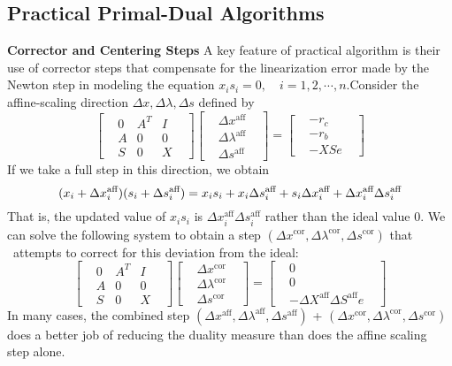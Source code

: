 \subsection{Practical Primal-Dual Algorithms} \label{subsec:-practical-primal-dual-algorithms}
\textbf{Corrector and Centering Steps}
A key feature of practical algorithm is their use of corrector steps that compensate for the linearization error made by
the Newton step in modeling the equation $x_i s_i = 0, \quad i = 1,2,\cdots, n$.Consider the affine-scaling direction
$\Delta x, \Delta \lambda, \Delta s $ defined by
\[
    \begin{bmatrix}
        & 0 & A^T & I & \\
        & A & 0 & 0 & \\
        & S & 0 & X
    \end{bmatrix}
    \begin{bmatrix}
        & \Delta x^{\text{aff}} &\\
        & \Delta \lambda^{\text{aff}} & \\
        & \Delta s^{\text{aff}} &
    \end{bmatrix} =
    \begin{bmatrix}
        & -r_c &\\
        & -r_b & \\
        & -XSe  &
    \end{bmatrix}\tag{14.30}\label{ipm: 14.30}
\]
If we take a full step in this direction, we obtain
\[
    (x_i + \Delta x_i^{\text{aff}})(s_i + \Delta s_i^{\text{aff}})\\
    = x_i s_i + x_i \Delta s_i^{\text{aff}} + s_i \Delta x_i^{\text{aff}} + \Delta x_i^{\text{aff}}\Delta s_i^{\text{aff}}
\]
That is, the updated value of $x_i s_i$ is $\Delta x_i^{\text{aff}}\Delta s_i^{\text{aff}}$ rather than the ideal value 0.
We can solve the following system to obtain a step $(\Delta x^{\text{cor}}, \Delta\lambda^{\text{cor}}, \Delta s^{\text{cor}})$ that \
attempts to correct for this deviation from the ideal:
\[
    \begin{bmatrix}
        & 0 & A^T & I & \\
        & A & 0 & 0 & \\
        & S & 0 & X
    \end{bmatrix}
    \begin{bmatrix}
        & \Delta x^{\text{cor}} &\\
        & \Delta \lambda^{\text{cor}} & \\
        & \Delta s^{\text{cor}} &
    \end{bmatrix} =
    \begin{bmatrix}
        & 0 &\\
        & 0 & \\
        & -\Delta X^{\text{aff}}\Delta S^{\text{aff}} e  &
    \end{bmatrix}\tag{14.31}\label{ipm: 14.31}
\]
In many cases, the combined step $(\Delta x^{\text{aff}}, \Delta\lambda^{\text{aff}}, \Delta s^{\text{aff}})$ +
$(\Delta x^{\text{cor}}, \Delta\lambda^{\text{cor}}, \Delta s^{\text{cor}})$
does a better job of reducing the duality measure than does the affine scaling step alone.
